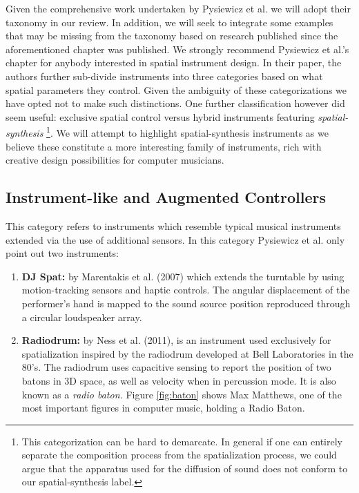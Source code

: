 Given the comprehensive work undertaken by Pysiewicz et al. we will adopt their taxonomy in our review. In addition, we will seek to integrate some examples that may be missing from the taxonomy based on research published since the aforementioned chapter was published. We strongly recommend Pysiewicz et al.'s chapter for anybody interested in spatial instrument design. In their paper, the authors further sub-divide instruments into three categories based on what spatial parameters they control. Given the ambiguity of these categorizations we have opted not to make such distinctions. One further classification however did seem useful: exclusive spatial control versus hybrid instruments featuring \textit{spatial-synthesis} \footnote{This categorization can be hard to demarcate. In general if one can entirely separate the composition process from the spatialization process, we could argue that the apparatus used for the diffusion of sound does not conform to our spatial-synthesis label.}. We will attempt to highlight spatial-synthesis instruments as we believe these constitute a more interesting family of instruments, rich with creative design possibilities for computer musicians.

\subsection{Instrument-like and Augmented Controllers}

This category refers to instruments which resemble typical musical instruments extended via the use of additional sensors. In this category Pysiewicz et al. only point out two instruments: 

\begin{enumerate}
    \item \textbf{DJ Spat:} by Marentakis et al. (2007) which extends the turntable by using motion-tracking sensors and haptic controls. The angular displacement of the performer's hand is mapped to the sound source position reproduced through a circular loudspeaker array. 
    \item \textbf{Radiodrum:} by Ness et al. (2011), is an instrument used exclusively for spatialization inspired by the radiodrum developed at Bell Laboratories in the 80's. The radiodrum uses capacitive sensing to report the position of two batons in 3D space, as well as velocity when in percussion mode. It is also known as a \textit{radio baton.} Figure \ref{fig:baton} shows Max Matthews, one of the most important figures in computer music, holding a Radio Baton.
\end{enumerate}


